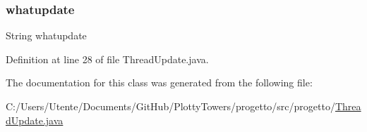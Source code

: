 \subsubsection{\texorpdfstring{whatupdate}{whatupdate}}
{\footnotesize\ttfamily String whatupdate\hspace{0.3cm}{\ttfamily [private]}}



Definition at line 28 of file Thread\+Update.\+java.



The documentation for this class was generated from the following file\+:\begin{DoxyCompactItemize}
\item 
C\+:/\+Users/\+Utente/\+Documents/\+Git\+Hub/\+Plotty\+Towers/progetto/src/progetto/\hyperlink{_thread_update_8java}{Thread\+Update.\+java}\end{DoxyCompactItemize}
